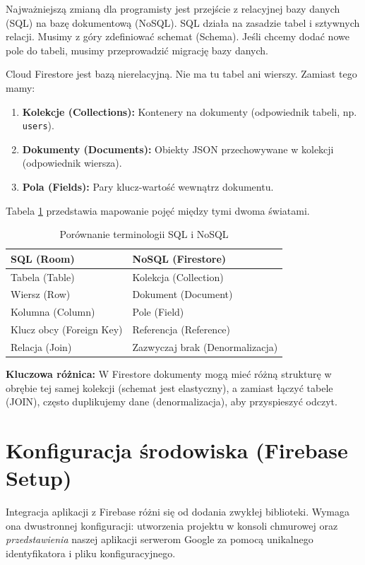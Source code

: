 Najważniejszą zmianą dla programisty jest przejście z relacyjnej bazy danych (SQL) na bazę dokumentową (NoSQL). SQL działa na zasadzie tabel i sztywnych relacji. Musimy z góry zdefiniować schemat (Schema). Jeśli chcemy dodać nowe pole do tabeli, musimy przeprowadzić migrację bazy danych.

Cloud Firestore jest bazą nierelacyjną. Nie ma tu tabel ani wierszy. Zamiast tego mamy:
\begin{enumerate}
    \item \textbf{Kolekcje (Collections):} Kontenery na dokumenty (odpowiednik tabeli, np. \texttt{users}).
    \item \textbf{Dokumenty (Documents):} Obiekty JSON przechowywane w kolekcji (odpowiednik wiersza).
    \item \textbf{Pola (Fields):} Pary klucz-wartość wewnątrz dokumentu.
\end{enumerate}

Tabela \ref{tab:sql_vs_nosql} przedstawia mapowanie pojęć między tymi dwoma światami.

\begin{table}[h]
\centering
\begin{tabular}{|l|l|}
\hline
\textbf{SQL (Room)} & \textbf{NoSQL (Firestore)} \\ \hline
Tabela (Table) & Kolekcja (Collection) \\ \hline
Wiersz (Row) & Dokument (Document) \\ \hline
Kolumna (Column) & Pole (Field) \\ \hline
Klucz obcy (Foreign Key) & Referencja (Reference) \\ \hline
Relacja (Join) & Zazwyczaj brak (Denormalizacja) \\ \hline
\end{tabular}
\caption{Porównanie terminologii SQL i NoSQL}
\label{tab:sql_vs_nosql}
\end{table}

\textbf{Kluczowa różnica:} W Firestore dokumenty mogą mieć różną strukturę w obrębie tej samej kolekcji (schemat jest elastyczny), a zamiast łączyć tabele (JOIN), często duplikujemy dane (denormalizacja), aby przyspieszyć odczyt.

\section{Konfiguracja środowiska (Firebase Setup)}

Integracja aplikacji z Firebase różni się od dodania zwykłej biblioteki. Wymaga ona dwustronnej konfiguracji: utworzenia projektu w konsoli chmurowej oraz \textit{przedstawienia} naszej aplikacji serwerom Google za pomocą unikalnego identyfikatora i pliku konfiguracyjnego. 

